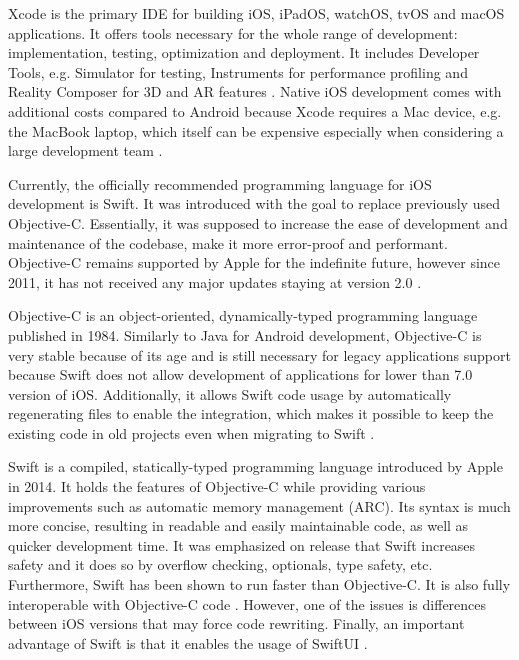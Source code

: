 Xcode is the primary IDE for building iOS, iPadOS, watchOS, tvOS and macOS applications. It offers tools necessary for the whole range of development: implementation, testing, optimization and deployment. It includes Developer Tools, e.g. Simulator for testing, Instruments for performance profiling and Reality Composer for 3D and AR features \cite{xcode_documentation}. Native iOS development comes with additional costs compared to Android because Xcode requires a Mac device, e.g. the MacBook laptop, which itself can be expensive especially when considering a large development team \cite{comparison_technologies_multiplatform}\cite{comp_study_hybrid}.

Currently, the officially recommended programming language for iOS development is Swift. It was introduced with the goal to replace previously used Objective-C. Essentially, it was supposed to increase the ease of development and maintenance of the codebase, make it more error-proof and performant. Objective-C remains supported by Apple for the indefinite future, however since 2011, it has not received any major updates staying at version 2.0 \cite{swift_overview}\cite{speed_performance_swift_objective_c}\cite{swift_vs_objective_c}\cite{wiki_objective_c}.

Objective-C is an object-oriented, dynamically-typed programming language published in 1984. Similarly to Java for Android development, Objective-C is very stable because of its age and is still necessary for legacy applications support because Swift does not allow development of applications for lower than 7.0 version of iOS. Additionally, it allows Swift code usage by automatically regenerating files to enable the integration, which makes it possible to keep the existing code in old projects even when migrating to Swift \cite{swift_objective_c_new_language}\cite{geeks_objective_c_swift}.

Swift is a compiled, statically-typed programming language introduced by Apple in 2014. It holds the features of Objective-C while providing various improvements such as automatic memory management (ARC). Its syntax is much more concise, resulting in readable and easily maintainable code, as well as quicker development time. It was emphasized on release that Swift increases safety and it does so by overflow checking, optionals, type safety, etc. Furthermore, Swift has been shown to run faster than Objective-C. It is also fully interoperable with Objective-C code \cite{swift_overview}\cite{swift_objective_c_new_language}\cite{geeks_objective_c_swift}. However, one of the issues is differences between iOS versions that may force code rewriting. Finally, an important advantage of Swift is that it enables the usage of SwiftUI \cite{comparison_technologies_multiplatform}.

